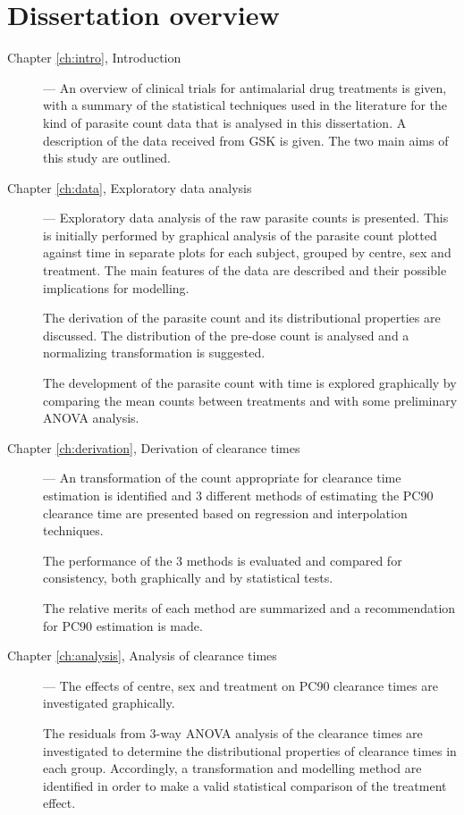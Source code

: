 \section{Dissertation overview}
\begin{description}
\item[Chapter \ref{ch:intro}, Introduction] --- An overview of clinical trials for antimalarial drug treatments is given, with a summary of the statistical techniques used in the literature for the kind of parasite count data that is analysed in this dissertation. A description of the data received from GSK is given. The two main aims of this study are outlined.
\item[Chapter \ref{ch:data}, Exploratory data analysis] --- Exploratory data analysis of the raw parasite counts is presented. This is initially performed by graphical analysis of the parasite count plotted against time in separate plots for each subject, grouped by centre, sex and treatment. The main features of the data are described and their possible implications for modelling.

The derivation of the parasite count and its distributional properties are discussed. The distribution of the pre-dose count is analysed and a normalizing transformation is suggested.

The development of the parasite count with time is explored graphically by comparing the mean counts between treatments and with some preliminary ANOVA analysis.
\item[Chapter \ref{ch:derivation}, Derivation of clearance times] --- An transformation of the count appropriate for clearance time estimation is identified and 3 different methods of estimating the PC90 clearance time are presented based on regression and interpolation techniques.

The performance of the 3 methods is evaluated and compared for consistency, both graphically and by statistical tests.

The relative merits of each method are summarized and a recommendation for PC90 estimation is made.
\item[Chapter \ref{ch:analysis}, Analysis of clearance times] --- The effects of centre, sex and treatment on PC90 clearance times are investigated graphically.

The residuals from 3-way ANOVA analysis of the clearance times are investigated to determine the distributional properties of clearance times in each group. Accordingly, a transformation and modelling method are identified in order to make a valid statistical comparison of the treatment effect.


\end{description}
